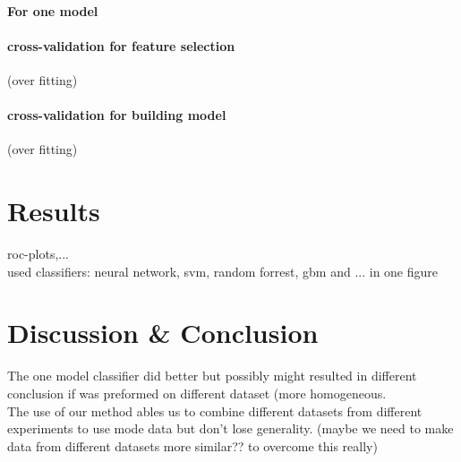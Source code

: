 \documentclass[a4paper]{article}
\begin{document}
\paragraph{For one model}

\paragraph{cross-validation for feature selection}

(over fitting)

\paragraph{cross-validation for building model}

(over fitting)


\section{Results}

roc-plots,...\\
used classifiers: neural network, svm, random forrest, gbm and ... in one figure


\section{Discussion \& Conclusion}

The one model classifier did better but possibly might resulted in different conclusion if was preformed on different dataset (more homogeneous.\\

The use of our method ables us to combine different datasets from different experiments to use mode data but don't lose generality. (maybe we need to make data from different datasets more similar?? to overcome this really)
\end{document}
